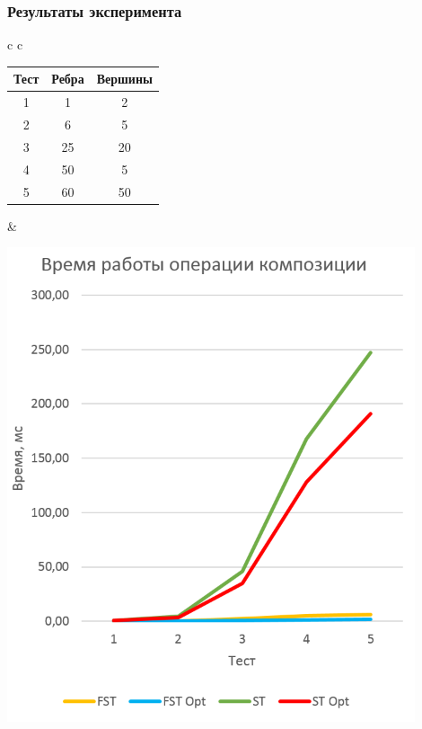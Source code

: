 \documentclass{beamer}
\begin{document}
\begin{frame}
  \transwipe[direction=90]
  \frametitle{Результаты эксперимента}
    
\begin{table}[H]
\begin{center}
\begin{tabular}{c c}
\begin{minipage}{0.4\textwidth}
\begin{tabular}{|c|c|c|}

\hline 
Тест & Ребра & Вершины\\  
\hline 
1 & 1 & 2 \\
2 & 6 & 5 \\
3 & 25 & 20 \\
4 & 50 & 5 \\
5 & 60 & 50 \\
\hline 

\end{tabular}
\end{minipage}
&
\begin{minipage}{0.6\textwidth}
 \includegraphics[width=0.9\textwidth]{../pictures/newgraph1.PNG}
\end{minipage}

\end{tabular}

\end{center}
\end{table} 
\end{frame}
\end{document}
